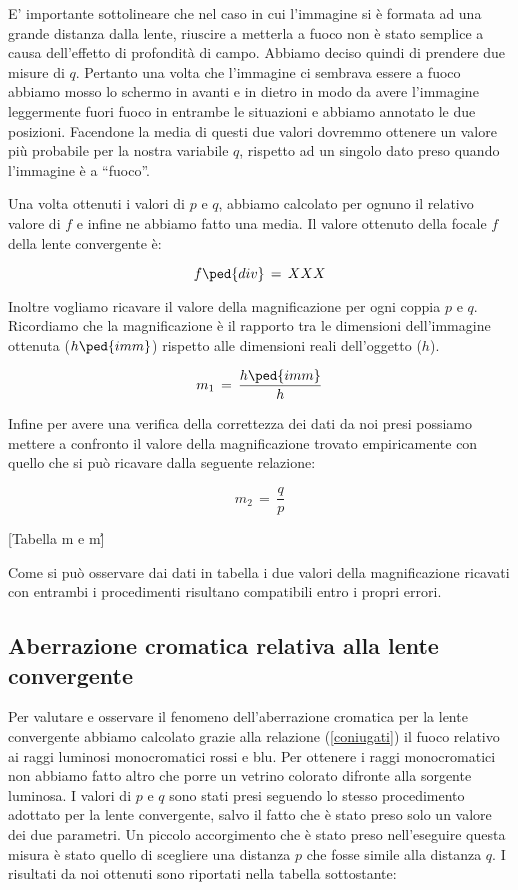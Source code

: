 E' importante sottolineare che nel caso in cui l'immagine si è formata ad una grande distanza dalla lente, riuscire a metterla a fuoco non è stato semplice a causa dell'effetto di profondità di campo. Abbiamo deciso quindi di prendere due misure di $q$. Pertanto una volta che l'immagine ci sembrava essere a fuoco abbiamo mosso lo schermo in avanti e in dietro in modo da avere l'immagine leggermente fuori fuoco in entrambe le situazioni e abbiamo annotato le due posizioni. Facendone la media di questi due valori dovremmo ottenere un valore più probabile per la nostra variabile $q$, rispetto ad un singolo dato preso quando l'immagine è a ``fuoco''.

Una volta ottenuti i valori  di $p$ e $q$, abbiamo calcolato per ognuno il relativo valore di $f$ e infine ne abbiamo fatto una media.
Il valore ottenuto della focale $f$ della lente convergente è:

\begin{equation}
	f \ped{div} \,=\, XXX
\end{equation}

Inoltre vogliamo ricavare il valore della magnificazione per ogni coppia $p$ e $q$. Ricordiamo che la magnificazione è il rapporto tra le dimensioni dell'immagine ottenuta ($h \ped{imm}$) rispetto alle dimensioni reali dell'oggetto ($h$).

\begin{equation}
	m_{1} \,=\, \frac{h \ped{imm}}{h}
\end{equation}

Infine per avere una verifica della correttezza dei dati da noi presi possiamo mettere a confronto il valore della magnificazione trovato empiricamente con quello che si può ricavare dalla seguente relazione:

\begin{equation}
	m_{2} \,=\, \frac{q}{p}
\end{equation}

[Tabella m e m\']

Come si può osservare dai dati in tabella i due valori della magnificazione ricavati con entrambi i procedimenti risultano compatibili entro i propri errori. 

\subsection{Aberrazione cromatica relativa alla lente convergente}

Per valutare e osservare il fenomeno dell'aberrazione cromatica per la lente convergente abbiamo calcolato grazie alla relazione (\ref{coniugati}) il fuoco relativo ai raggi luminosi monocromatici rossi e blu. Per ottenere i raggi monocromatici non abbiamo fatto altro che porre un vetrino colorato difronte alla sorgente luminosa. I valori di $p$ e $q$ sono stati presi seguendo lo stesso procedimento adottato per la lente convergente, salvo il fatto che è stato preso solo un valore dei due parametri.
Un piccolo accorgimento che è stato preso nell'eseguire questa misura è stato quello di scegliere una distanza $p$ che fosse simile alla distanza $q$.
I risultati da noi ottenuti sono riportati nella tabella sottostante:

